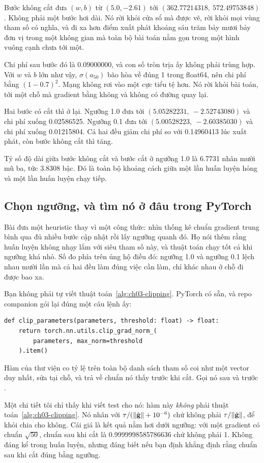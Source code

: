 %
Bước không cắt đưa \((w, b)\) từ \((5.0, -2.61)\) tới
\((362.77214318,\ 572.49753848)\). Không phải một bước hơi dài. Nó rời khỏi
cửa sổ mà  được vẽ, rời khỏi mọi vùng tham số có nghĩa, và đi xa hơn
điểm xuất phát khoảng sáu trăm bảy mươi bảy đơn vị trong một không gian mà toàn
bộ bài toán nằm gọn trong một hình vuông cạnh chưa tới một.

Chi phí sau bước đó là 0.09000000, và con số tròn trịa ấy không phải trùng hợp.
Với \(w\) và \(b\) lớn như vậy, \(\sigma(a_{50})\) bão hòa về đúng 1 trong
float64, nên chi phí bằng \((1 - 0.7)^2\). Mạng không rơi vào một cực tiểu tệ
hơn. Nó rời khỏi bài toán, tới một chỗ mà gradient bằng không và không có đường
quay lại.

Hai bước có cắt thì ở lại. Ngưỡng 1.0 đưa tới \((5.05282231,\ -2.52743080)\) và
chi phí xuống 0.02586525. Ngưỡng 0.1 đưa tới \((5.00528223,\ -2.60385030)\) và
chi phí xuống 0.01215804. Cả hai đều giảm chi phí so với 0.14960413 lúc xuất
phát, còn bước không cắt thì tăng.

Tỷ số độ dài giữa bước không cắt và bước cắt ở ngưỡng 1.0 là 6.7731 nhân mười
mũ ba, tức 3.8308 bậc. Đó là toàn bộ khoảng cách giữa một lần huấn luyện hỏng
và một lần huấn luyện chạy tiếp.

\subsection*{Chọn ngưỡng, và tìm nó ở đâu trong PyTorch}

%
Bài đưa một heuristic thay vì một công thức: nhìn thống kê chuẩn gradient trung
bình qua đủ nhiều bước cập nhật rồi lấy ngưỡng quanh đó. Họ nói thêm rằng huấn
luyện không nhạy lắm với siêu tham số này, và thuật toán chạy tốt cả khi ngưỡng
khá nhỏ. Số đo phía trên ủng hộ điều đó: ngưỡng 1.0 và ngưỡng 0.1 lệch nhau mười
lần mà cả hai đều làm đúng việc cần làm, chỉ khác nhau ở chỗ đi được bao xa.

Bạn không phải tự viết thuật toán~\ref{alg:ch03-clipping}. PyTorch có sẵn, và
repo companion gói lại đúng một câu lệnh ấy:

\begin{verbatim}
def clip_parameters(parameters, threshold: float) -> float:
    return torch.nn.utils.clip_grad_norm_(
        parameters, max_norm=threshold
    ).item()
\end{verbatim}

Hàm của thư viện co tỷ lệ trên toàn bộ danh sách tham số coi như một vector duy
nhất, sửa  tại chỗ, và trả về chuẩn nó thấy trước khi cắt. Gọi nó
sau  và trước .

Một chi tiết tôi chỉ thấy khi viết test cho nó: hàm này \emph{không} phải thuật
toán~\ref{alg:ch03-clipping}. Nó nhân với \(\tau / (\lVert \hat{\mathbf{g}} \rVert + 10^{-6})\)
chứ không phải \(\tau / \lVert \hat{\mathbf{g}} \rVert\), để khỏi chia cho không. Cái giá
là kết quả nằm hơi dưới ngưỡng: với một gradient có chuẩn \(\sqrt{50}\), chuẩn
sau khi cắt là 0.9999998585786636 chứ không phải 1. Không đáng kể trong huấn
luyện, nhưng đáng biết nếu bạn định khẳng định rằng chuẩn sau khi cắt đúng bằng
ngưỡng.
